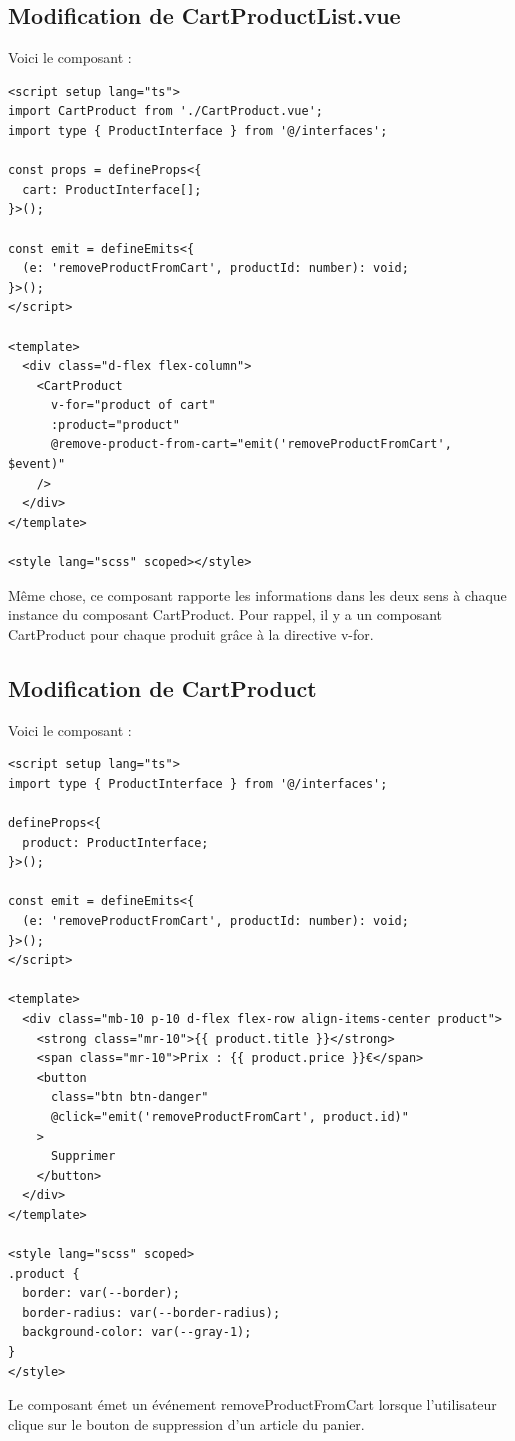 \subsection{Modification de {\color{monOrange}CartProductList.vue}}
Voici le composant :
\begin{verbatim}
<script setup lang="ts">
import CartProduct from './CartProduct.vue';
import type { ProductInterface } from '@/interfaces';

const props = defineProps<{
  cart: ProductInterface[];
}>();

const emit = defineEmits<{
  (e: 'removeProductFromCart', productId: number): void;
}>();
</script>

<template>
  <div class="d-flex flex-column">
    <CartProduct
      v-for="product of cart"
      :product="product"
      @remove-product-from-cart="emit('removeProductFromCart', $event)"
    />
  </div>
</template>

<style lang="scss" scoped></style>
\end{verbatim}
Même chose, ce composant rapporte les informations dans les deux sens à chaque instance du composant {\color{monOrange}CartProduct}. Pour rappel, il y a un composant {\color{monOrange}CartProduct} pour chaque produit grâce à la directive {\color{monOrange}v-for}.
\subsection{Modification de {\color{monOrange}CartProduct}}
Voici le composant :
\begin{verbatim}
<script setup lang="ts">
import type { ProductInterface } from '@/interfaces';

defineProps<{
  product: ProductInterface;
}>();

const emit = defineEmits<{
  (e: 'removeProductFromCart', productId: number): void;
}>();
</script>

<template>
  <div class="mb-10 p-10 d-flex flex-row align-items-center product">
    <strong class="mr-10">{{ product.title }}</strong>
    <span class="mr-10">Prix : {{ product.price }}€</span>
    <button
      class="btn btn-danger"
      @click="emit('removeProductFromCart', product.id)"
    >
      Supprimer
    </button>
  </div>
</template>

<style lang="scss" scoped>
.product {
  border: var(--border);
  border-radius: var(--border-radius);
  background-color: var(--gray-1);
}
</style>
\end{verbatim}
Le composant émet un événement {\color{monOrange}removeProductFromCart} lorsque l'utilisateur clique sur le bouton de suppression d'un article du panier.

